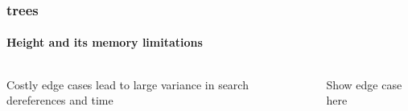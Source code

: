 \begin{frame}
  \frametitle{\kd trees}
  \framesubtitle{Height and its memory limitations}

  \begin{columns}[T]
    \begin{column}{.5\textwidth}
      \begin{block}{}%
        {\color{white} Costly edge cases lead to large variance in search dereferences 
          and time}
      \end{block}
    \end{column}
    \begin{column}{.5\textwidth}
      \begin{block}{}
        Show edge case here
      \end{block}
    \end{column}
  \end{columns}
\end{frame}

